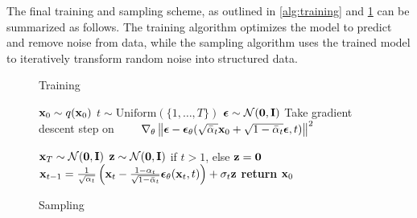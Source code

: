 The final training and sampling scheme, as outlined in \cref{alg:training} and \cref{alg:sampling} can be summarized as follows. The training algorithm optimizes the model to predict and remove noise from data, while the sampling algorithm uses the trained model to iteratively transform random noise into structured data.

\algrenewcommand\algorithmicindent{0.5em}%
\begin{figure}[t]
\begin{minipage}[t]{0.495\textwidth}
\begin{algorithm}[H]
  \caption{Training} \label{alg:training}
  \small
  \begin{algorithmic}[1]
    \Repeat
      \State $\boldsymbol{\mathbf{x}}_0 \sim q(\boldsymbol{\mathbf{x}}_0)$
      \State $t \sim \mathrm{Uniform}(\{1, \dotsc, T\})$
      \State $\boldsymbol{\mathbf{\epsilon}}\sim\mathcal{N}(\boldsymbol{\mathbf{0}},\boldsymbol{\mathbf{I}})$
      \State Take gradient descent step on
      \Statex $\qquad \nabla_\theta \left\| \boldsymbol{\mathbf{\epsilon}} - \boldsymbol{\mathbf{\epsilon}}_\theta(\sqrt{\bar\alpha_t} \boldsymbol{\mathbf{x}}_0 + \sqrt{1-\bar\alpha_t}\boldsymbol{\mathbf{\epsilon}}, t) \right\|^2$
  \end{algorithmic}
\end{algorithm}
\end{minipage}
\hfill
\begin{minipage}[t]{0.495\textwidth}
\begin{algorithm}[H]
  \caption{Sampling} \label{alg:sampling}
  \small
  \begin{algorithmic}[1]
    \vspace{.04in}
    \State $\boldsymbol{\mathbf{x}}_T \sim \mathcal{N}(\boldsymbol{\mathbf{0}}, \boldsymbol{\mathbf{I}})$
      \State $\boldsymbol{\mathbf{z}} \sim \mathcal{N}(\boldsymbol{\mathbf{0}}, \boldsymbol{\mathbf{I}})$ if $t > 1$, else $\boldsymbol{\mathbf{z}} = \boldsymbol{\mathbf{0}}$
      \State $\boldsymbol{\mathbf{x}}_{t-1} = \frac{1}{\sqrt{\alpha_t}}\left( \boldsymbol{\mathbf{x}}_t - \frac{1-\alpha_t}{\sqrt{1-\bar\alpha_t}} \boldsymbol{\mathbf{\epsilon}}_\theta(\boldsymbol{\mathbf{x}}_t, t) \right) + \sigma_t \boldsymbol{\mathbf{z}}$
    \EndFor
    \State \textbf{return} $\boldsymbol{\mathbf{x}}_0$
    \vspace{.04in}
  \end{algorithmic}
\end{algorithm}
\end{minipage}
\vspace{-1em}
\end{figure}


